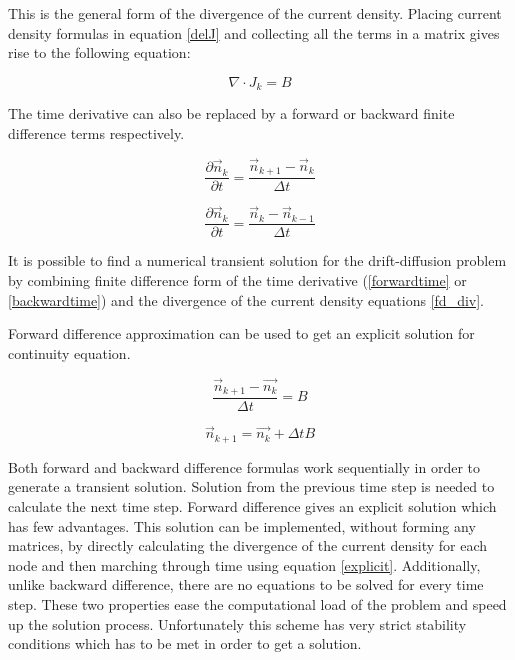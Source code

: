 \begin{doublespace}
This is the general form of the divergence of the current density. Placing current density formulas in equation \ref{delJ} and collecting all the terms in a matrix gives rise to the following equation:

\begin{equation}
\nabla \cdot J_k =B
\label{fd_div}
\end{equation}

The time derivative can also be replaced by a forward or backward finite difference terms respectively.

\begin{equation}
\frac{\partial  \vec{n}_k}{\partial t}=\frac{ \vec{n}_{k+1}-\vec{n}_k}{\Delta t}
\label{forwardtime}
\end{equation}

\begin{equation}
\frac{\partial \vec{n}_k}{\partial t}=\frac{ \vec{n}_k- \vec{n}_{k-1}}{\Delta t}
\label{backwardtime}
\end{equation}

It is possible to find a numerical transient solution for the drift-diffusion problem by combining finite difference form of the time derivative (\eqref{forwardtime} or \eqref{backwardtime}) and the divergence of the current density equations \eqref{fd_div}.

Forward difference approximation can be used to get an explicit solution for continuity equation.

\begin{equation}\nonumber
\frac{ \vec{n}_{k+1}-\vec{n_k}}{\Delta t}=B
\end{equation}

\begin{equation}
\vec{n}_{k+1}=\vec{n_{k}}+\Delta t B
\label{explicit}
\end{equation}

Both forward and backward difference formulas work sequentially in order to generate a transient solution. Solution from the previous time step is needed to calculate the next time step. Forward difference gives an explicit solution which has few advantages. This solution can be implemented, without forming any matrices, by directly calculating the divergence of the current density for each node and then marching through time using equation \ref{explicit}. Additionally, unlike backward difference, there are no equations to be solved for every time step. These two properties ease the computational load of the problem and speed up the solution process. Unfortunately this scheme has very strict stability conditions which has to be met in order to get a solution.


\end{doublespace}

